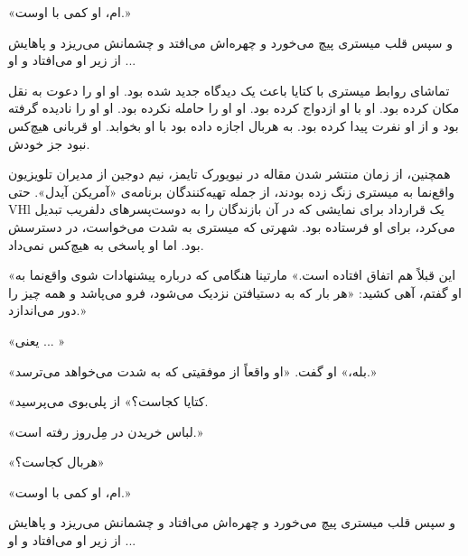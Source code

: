 «ام، او کمی با اوست.»

و سپس قلب میستری پیچ می‌خورد و چهره‌اش می‌افتد و چشمانش می‌ریزد و پاهایش از زیر او می‌افتاد و او ...

تماشای روابط میستری با کتایا باعث یک دیدگاه جدید شده بود. او او را دعوت به نقل مکان کرده بود. او با او ازدواج کرده بود. او او را حامله نکرده بود. او او را نادیده گرفته بود و از او نفرت پیدا کرده بود. به هربال اجازه داده بود با او بخوابد. او قربانی هیچ‌کس نبود جز خودش.

همچنین، از زمان منتشر شدن مقاله در نیویورک تایمز، نیم دوجین از مدیران تلویزیون واقع‌نما به میستری زنگ زده بودند، از جمله تهیه‌کنندگان برنامه‌ی «آمریکن آیدل». حتی VHl یک قرارداد برای نمایشی که در آن بازندگان را به دوست‌پسرهای دلفریب تبدیل می‌کرد، برای او فرستاده بود. شهرتی که میستری به شدت می‌خواست، در دسترسش بود. اما او پاسخی به هیچ‌کس نمی‌داد.

«این قبلاً هم اتفاق افتاده است.» مارتینا هنگامی که درباره پیشنهادات شوی واقع‌نما به او گفتم، آهی کشید: «هر بار که به دستیافتن نزدیک می‌شود، فرو می‌پاشد و همه چیز را دور می‌اندازد.»

«یعنی ... »

«بله،» او گفت. «او واقعاً از موفقیتی که به شدت می‌خواهد می‌ترسد.»

«کتایا کجاست؟» از پلی‌بوی می‌پرسید.

«لباس خریدن در مِل‌روز رفته است.»

«هربال کجاست؟»

«ام، او کمی با اوست.»

و سپس قلب میستری پیچ می‌خورد و چهره‌اش می‌افتاد و چشمانش می‌ریزد و پاهایش از زیر او می‌افتاد و او ...